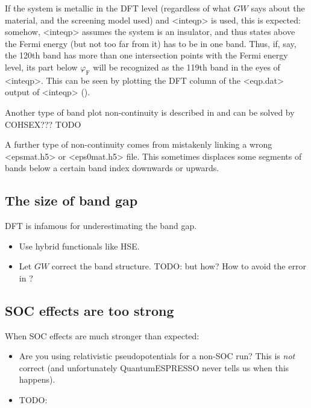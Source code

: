 \documentclass[hyperref, a4paper, 12pt]{report}
\def\texttt#1{<#1>}%
\newcommand{\shortcode}[1]{\texttt{#1}}
\begin{document}
If the system is metallic in the DFT level 
(regardless of what $GW$ says about the material, 
and the screening model used)
and \shortcode{inteqp} is used, 
this is expected:
somehow, \shortcode{inteqp} assumes the system is an insulator,
and thus states above the Fermi energy (but not too far from it)
has to be in one band.
Thus, if, say, the 120th band has more than one intersection points 
with the Fermi energy level,
its part below $\varphi_{\text{F}}$ will be recognized as the 119th band
in the eyes of \shortcode{inteqp}.
This can be seen by plotting the DFT column of the \shortcode{eqp.dat} output of \shortcode{inteqp}
().

Another type of band plot non-continuity is described in \cite{berger2020potential} 
and can be solved by COHSEX??? TODO

A further type of non-continuity comes from mistakenly linking a wrong \shortcode{epsmat.h5} 
or \shortcode{eps0mat.h5} file.
This sometimes displaces some segments of bands below a certain band index downwards or upwards.

\subsection{The size of band gap}\label{sec:band-gap-problem}

DFT is infamous for underestimating the band gap.

\begin{itemize}
    \item Use hybrid functionals like HSE.
    \item Let $GW$ correct the band structure. TODO: but how? How to avoid the error in ?
\end{itemize}

\subsection{SOC effects are too strong}

When SOC effects are much stronger than expected: 
\begin{itemize}
    \item Are you using relativistic pseudopotentials for a non-SOC run?
        This is \emph{not} correct 
        (and unfortunately QuantumESPRESSO never tells us when this happens).
    \item TODO: 
\end{itemize}
\end{document}
